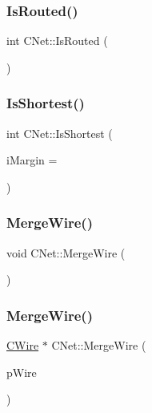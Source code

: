 \mbox{\label{classCNet_a0c25ee386b4a476bee6a6d86da9959d9}} 
\subsubsection{\texorpdfstring{IsRouted()}{IsRouted()}}
{\footnotesize\ttfamily int C\+Net\+::\+Is\+Routed (\begin{DoxyParamCaption}{ }\end{DoxyParamCaption})}

\mbox{\label{classCNet_a7bc0cfc0aa81625c0d4e36add2585262}} 
\subsubsection{\texorpdfstring{IsShortest()}{IsShortest()}}
{\footnotesize\ttfamily int C\+Net\+::\+Is\+Shortest (\begin{DoxyParamCaption}\item[{int}]{i\+Margin = {} }\end{DoxyParamCaption})}

\mbox{\label{classCNet_a071afaff38f473f16963a9f81c39528a}} 
\subsubsection{\texorpdfstring{MergeWire()}{MergeWire()}\hspace{0.1cm}{\footnotesize\ttfamily [1/2]}}
{\footnotesize\ttfamily void C\+Net\+::\+Merge\+Wire (\begin{DoxyParamCaption}{ }\end{DoxyParamCaption})}

\mbox{\label{classCNet_a5441cfbbf2201282ce1b3e402a488473}} 
\subsubsection{\texorpdfstring{MergeWire()}{MergeWire()}\hspace{0.1cm}{\footnotesize\ttfamily [2/2]}}
{\footnotesize\ttfamily \mbox{\hyperlink{classCWire}{C\+Wire}} $\ast$ C\+Net\+::\+Merge\+Wire (\begin{DoxyParamCaption}\item[{\mbox{\hyperlink{classCWire}{C\+Wire}} $\ast$}]{p\+Wire }\end{DoxyParamCaption})}

